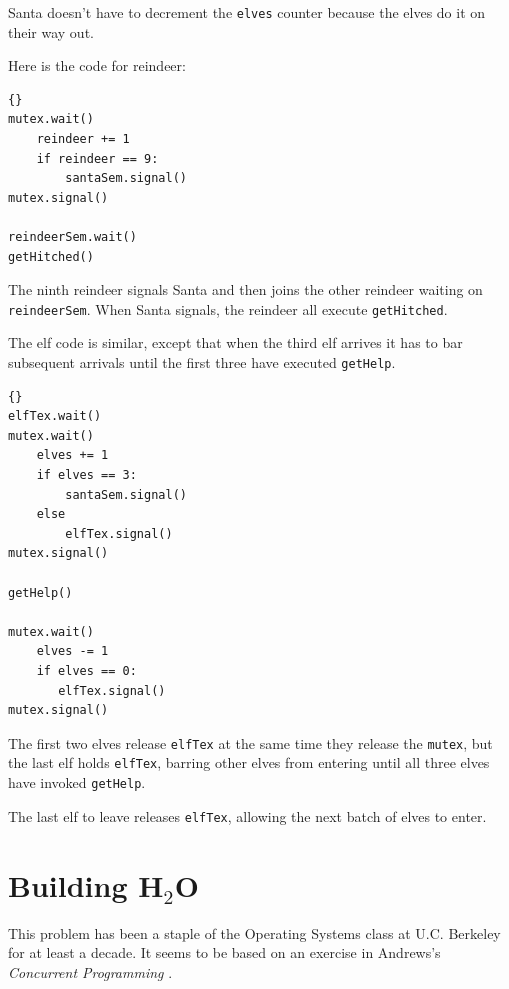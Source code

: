 \documentclass{book}
\begin{document}
Santa doesn't have to decrement
the {\tt elves} counter because the elves do it on their way
out.

Here is the code for reindeer:

\begin{latin}
\begin{latin}
\begin{lstlisting}[title={Santa problem solution (reindeer)}]{}
mutex.wait()
    reindeer += 1
    if reindeer == 9:
        santaSem.signal()
mutex.signal()

reindeerSem.wait()
getHitched()
\end{lstlisting}
\end{latin}
\end{latin}

The ninth reindeer signals Santa and then joins the other
reindeer waiting on {\tt reindeerSem}.  When Santa signals, the
reindeer all execute {\tt getHitched}.

The elf code is similar, except that when the third elf arrives
it has to bar subsequent arrivals until the first three have
executed {\tt getHelp}.

\newpage
\begin{latin}
\begin{latin}
\begin{lstlisting}[title={Santa problem solution (elves)}]{}
elfTex.wait()
mutex.wait()
    elves += 1
    if elves == 3:
        santaSem.signal()
    else
        elfTex.signal()
mutex.signal()

getHelp()

mutex.wait()
    elves -= 1
    if elves == 0:
       elfTex.signal()
mutex.signal()
\end{lstlisting}
\end{latin}
\end{latin}

The first two elves release {\tt elfTex} at the same time they release
the {\tt mutex}, but the last elf holds {\tt elfTex}, barring other
elves from entering until all three elves have invoked {\tt getHelp}.

The last elf to leave releases {\tt elfTex}, allowing the
next batch of elves to enter.

\newpage
\section{Building H$_2$O}
\label{water}

This problem has been a staple of the Operating Systems class
at U.C. Berkeley for at least a decade.  It seems to be based on
an exercise in Andrews's {\em Concurrent Programming} \cite{andrews}.
\end{document}
